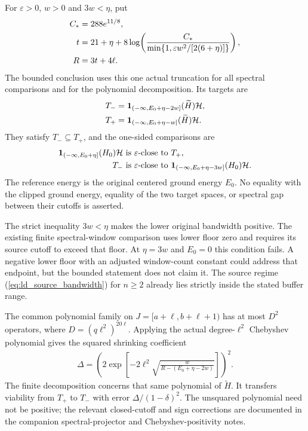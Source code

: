 \documentclass{article}
\begin{document}
For $\varepsilon>0$, $w>0$ and $3w<\eta$, put
\begin{align}
    C_*&=288e^{11/8},\notag\\
    t&=21+\eta+8\log\!\left(
       \frac{C_*}{\min\{1,\varepsilon w^2/[2(6+\eta)]\}}\right),\notag\\
    R&=3t+4\ell.
    \label{eq:ld_common_threshold}
\end{align}
The bounded conclusion uses this one actual truncation for all
spectral comparisons and for the polynomial decomposition. Its targets are
\begin{align}
    T_-&=\mathbf1_{(-\infty,E_0+\eta-2w]}(\widetilde H)\mathcal H,\notag\\
    T_+&=\mathbf1_{(-\infty,E_0+\eta-w]}(\widetilde H)\mathcal H.
    \label{eq:ld_nested_targets}
\end{align}
They satisfy $T_-\subseteq T_+$, and the one-sided comparisons are
\begin{align}
    \mathbf1_{(-\infty,E_0+\eta]}(H_0)\mathcal H
      &\text{ is }\varepsilon\text{-close to }T_+,\notag\\
    T_-&\text{ is }\varepsilon\text{-close to }
      \mathbf1_{(-\infty,E_0+\eta-3w]}(H_0)\mathcal H.
    \label{eq:ld_physical_sandwich}
\end{align}
The reference energy is the original centered ground energy $E_0$.
No equality with the clipped ground energy, equality of the two target
spaces, or spectral gap between their cutoffs is asserted.

The strict inequality $3w<\eta$ makes the lower original bandwidth positive.
The existing finite spectral-window comparison uses lower floor zero and
requires its source cutoff to exceed that floor. At $\eta=3w$ and $E_0=0$
this condition fails. A negative lower floor with an adjusted window-count
constant could address that endpoint, but the bounded statement does not
claim it. The source regime (\ref{eq:ld_source_bandwidth}) for $n\ge2$
already lies strictly inside the stated buffer range.

The common polynomial family on $J=[a+\ell,b+\ell+1)$ has at most $D^2$
operators, where $D=(q\ell^2)^{20\ell}$. Applying the actual degree-$\ell^2$
Chebyshev polynomial gives the squared shrinking coefficient
\begin{align}
    \Delta=\left(2\exp\!\left[-2\ell^2
      \sqrt{\frac{w}{R-(E_0+\eta-2w)}}\right]\right)^2.
    \label{eq:ld_explicit_filter_error}
\end{align}
The finite decomposition concerns that same polynomial of
$\widetilde H$. It transfers viability from $T_+$ to $T_-$ with error
$\Delta/(1-\delta)^2$. The unsquared polynomial need not be positive;
the relevant closed-cutoff and sign corrections are documented in the
companion spectral-projector and Chebyshev-positivity notes.
\end{document}
